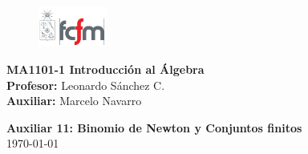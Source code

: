 \documentclass[letterpaper,11pt]{article}
\theoremstyle{plain}
\begin{document}
\newpage
\pagestyle{fancy}
\fancyhf{}

\begin{figure} %
    \vspace{-5mm}
    \includegraphics[width=0.2\textwidth]{img/fcfm2.png}
\end{figure}


\noindent
\textbf{MA1101-1 Introducción al Álgebra}\\
\textbf{Profesor: }Leonardo Sánchez C.\\
\textbf{Auxiliar: }Marcelo Navarro

\begin{center}
{\bf \Large Auxiliar 11: Binomio de Newton y Conjuntos finitos}\\
{\today}
\end{center}
\end{document}
